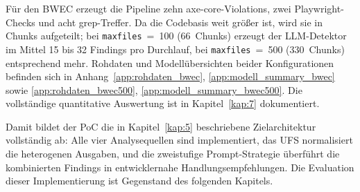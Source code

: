 Für den \ac{BWEC} erzeugt die Pipeline zehn axe-core-Violations, zwei Playwright-Checks und acht grep-Treffer. Da die Codebasis weit größer ist, wird sie in Chunks aufgeteilt; bei \texttt{maxfiles}~=~100 (66~Chunks) erzeugt der \acs{LLM}-Detektor im Mittel 15 bis 32 Findings pro Durchlauf, bei \texttt{maxfiles}~=~500 (330~Chunks) entsprechend mehr. Rohdaten und Modellübersichten beider Konfigurationen befinden sich in Anhang~\ref{app:rohdaten_bwec}, \ref{app:modell_summary_bwec} sowie \ref{app:rohdaten_bwec500}, \ref{app:modell_summary_bwec500}. Die vollständige quantitative Auswertung ist in Kapitel~\ref{kap:7} dokumentiert.

Damit bildet der \ac{PoC} die in Kapitel~\ref{kap:5} beschriebene Zielarchitektur vollständig ab: Alle vier Analysequellen sind implementiert, das \ac{UFS} normalisiert die heterogenen Ausgaben, und die zweistufige Prompt-Strategie überführt die kombinierten Findings in entwicklernahe Handlungsempfehlungen. Die Evaluation dieser Implementierung ist Gegenstand des folgenden Kapitels.